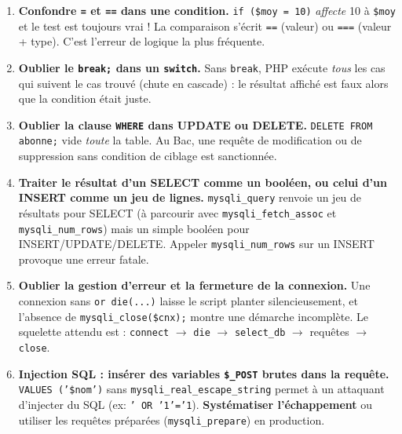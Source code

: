 \documentclass[11pt]{article}
\begin{document}
\begin{attention}
\begin{enumerate}
\item \textbf{Confondre \texttt{=} et \texttt{==} dans une condition.} \texttt{if (\$moy = 10)} \emph{affecte} 10 à \texttt{\$moy} et le test est toujours vrai ! La comparaison s'écrit \texttt{==} (valeur) ou \texttt{===} (valeur + type). C'est l'erreur de logique la plus fréquente.
\item \textbf{Oublier le \texttt{break;} dans un \texttt{switch}.} Sans \texttt{break}, PHP exécute \emph{tous} les cas qui suivent le cas trouvé (chute en cascade) : le résultat affiché est faux alors que la condition était juste.
\item \textbf{Oublier la clause \texttt{WHERE} dans UPDATE ou DELETE.} \texttt{DELETE FROM abonne;} vide \emph{toute} la table. Au Bac, une requête de modification ou de suppression sans condition de ciblage est sanctionnée.
\item \textbf{Traiter le résultat d'un SELECT comme un booléen, ou celui d'un INSERT comme un jeu de lignes.} \texttt{mysqli\_query} renvoie un jeu de résultats pour SELECT (à parcourir avec \texttt{mysqli\_fetch\_assoc} et \texttt{mysqli\_num\_rows}) mais un simple booléen pour INSERT/UPDATE/DELETE. Appeler \texttt{mysqli\_num\_rows} sur un INSERT provoque une erreur fatale.
\item \textbf{Oublier la gestion d'erreur et la fermeture de la connexion.} Une connexion sans \texttt{or die(...)} laisse le script planter silencieusement, et l'absence de \texttt{mysqli\_close(\$cnx);} montre une démarche incomplète. Le squelette attendu est : \texttt{connect} $\to$ \texttt{die} $\to$ \texttt{select\_db} $\to$ requêtes $\to$ \texttt{close}.
\item \textbf{Injection SQL : insérer des variables \texttt{\$\_POST} brutes dans la requête.} \texttt{VALUES ('\$nom')} sans \texttt{mysqli\_real\_escape\_string} permet à un attaquant d'injecter du SQL (ex: \texttt{' OR '1'='1}). \textbf{Systématiser l'échappement} ou utiliser les requêtes préparées (\texttt{mysqli\_prepare}) en production.
\end{enumerate}
\end{attention}
\end{document}
